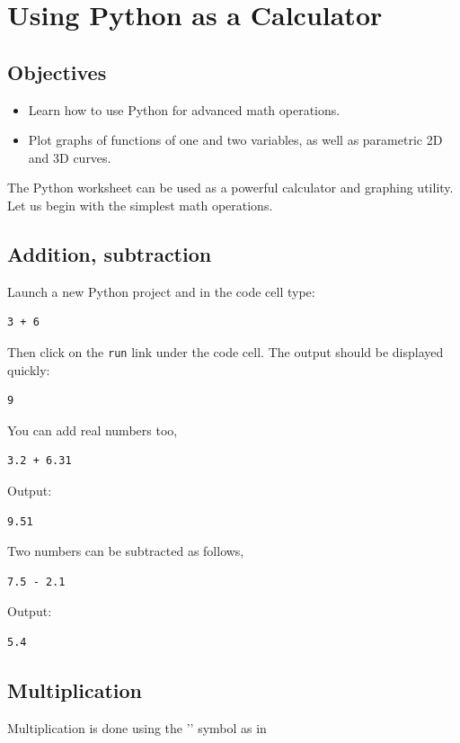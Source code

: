 
\section{Using Python as a Calculator} \label{sec:calc}

\subsection{Objectives}

\begin{itemize}
\item Learn how to use Python for advanced math operations.
\item Plot graphs of functions of one and two variables, as well as parametric 2D and 3D curves.
\end{itemize}
The Python worksheet can be used as a powerful calculator and graphing utility. 
Let us begin with the simplest math operations.

\subsection{Addition, subtraction}

Launch a new Python project and in the code cell type:

\begin{verbatim}
3 + 6
\end{verbatim}
Then click on the {\tt run} link under the code cell. The output should be displayed quickly:

\begin{verbatim}
9
\end{verbatim}
You can add real numbers too,
\begin{verbatim}
3.2 + 6.31
\end{verbatim}
Output:

\begin{verbatim}
9.51
\end{verbatim}
Two numbers can be subtracted as follows,

\begin{verbatim}
7.5 - 2.1
\end{verbatim}
Output:

\begin{verbatim}
5.4
\end{verbatim}

\subsection{Multiplication}
Multiplication is done using the '{\tt *}' symbol as in

